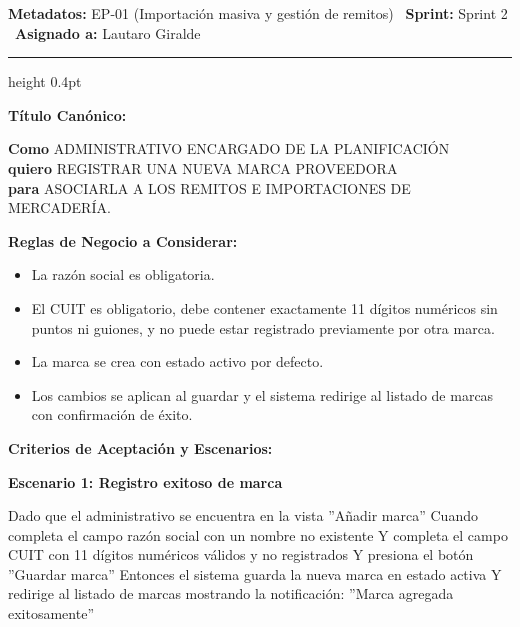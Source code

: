 \documentclass[a4paper,9pt]{article}
\begin{document}
\begin{tcolorbox}[hucard, title={\textbf{HU-240: CREAR MARCA} \hfill \scriptsize \colorbox{slatestatus}{\textbf{\ Done\ }} \quad \colorbox{white}{\textcolor{primarydark}{\textbf{\ 3 pts\ }}}}]
\vspace{-1pt}
\noindent\textbf{\footnotesize Metadatos:} EP-01 (Importación masiva y gestión de remitos) \textbar\ \textbf{Sprint:} Sprint 2 \textbar\ \textbf{Asignado a:} Lautaro Giralde\par\vspace{2pt}
\hrule height 0.4pt\par\vspace{3pt}
\noindent\textbf{\footnotesize Título Canónico:}\par\vspace{1pt}
{\small \textbf{Como} ADMINISTRATIVO ENCARGADO DE LA PLANIFICACIÓN \\ \textbf{quiero} REGISTRAR UNA NUEVA MARCA PROVEEDORA \\ \textbf{para} ASOCIARLA A LOS REMITOS E IMPORTACIONES DE MERCADERÍA.}\par\vspace{3pt}
\noindent\textbf{\footnotesize Reglas de Negocio a Considerar:}\par\vspace{1pt}
{\footnotesize
\begin{itemize}[leftmargin=12pt, nosep, itemsep=1.5pt, topsep=1pt]
\item La razón social es obligatoria.
\item El CUIT es obligatorio, debe contener exactamente 11 dígitos numéricos sin puntos ni guiones, y no puede estar registrado previamente por otra marca.
\item La marca se crea con estado activo por defecto.
\item Los cambios se aplican al guardar y el sistema redirige al listado de marcas con confirmación de éxito.
\end{itemize}
}\par\vspace{3pt}
\noindent\textbf{\footnotesize Criterios de Aceptación y Escenarios:}\par\vspace{2pt}
{\footnotesize
\noindent\textbf{\textcolor{secondarydark}{Escenario 1:  Registro exitoso de marca}}\par\vspace{1pt}
Dado que el administrativo se encuentra en la vista ''Añadir marca'' Cuando completa el campo razón social con un nombre no existente Y completa el campo CUIT con 11 dígitos numéricos válidos y no registrados Y presiona el botón ''Guardar marca'' Entonces el sistema guarda la nueva marca en estado activa Y redirige al listado de marcas mostrando la notificación: ''Marca agregada exitosamente''\par\vspace{2.5pt}
}
\end{tcolorbox}
\end{document}
